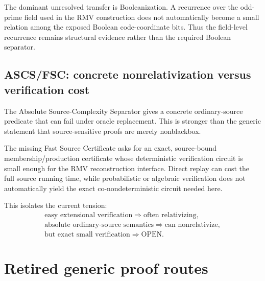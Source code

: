 \documentclass[11pt]{article}
\theoremstyle{plain}
\theoremstyle{definition}
\theoremstyle{remark}
\begin{document}
The dominant unresolved transfer is Booleanization.  A recurrence over the
odd-prime field used in the RMV construction does not automatically become a
small relation among the exposed Boolean code-coordinate bits.  Thus the
field-level recurrence remains structural evidence rather than the required
Boolean separator.

\subsection{ASCS/FSC: concrete nonrelativization versus verification cost}

The Absolute Source-Complexity Separator gives a concrete ordinary-source
predicate that can fail under oracle replacement.  This is stronger than the
generic statement that source-sensitive proofs are merely nonblackbox.

The missing Fast Source Certificate asks for an exact, source-bound
membership/production certificate whose deterministic verification circuit is
small enough for the RMV reconstruction interface.  Direct replay can cost the
full source running time, while probabilistic or algebraic verification does
not automatically yield the exact co-nondeterministic circuit needed here.

This isolates the current tension:
\[
\boxed{
\begin{array}{c}
\text{easy extensional verification}\Rightarrow\text{often relativizing},\\
\text{absolute ordinary-source semantics}\Rightarrow\text{can nonrelativize},\\
\text{but exact small verification}\Rightarrow\text{OPEN}.
\end{array}}
\]


\section{Retired generic proof routes}
\end{document}
